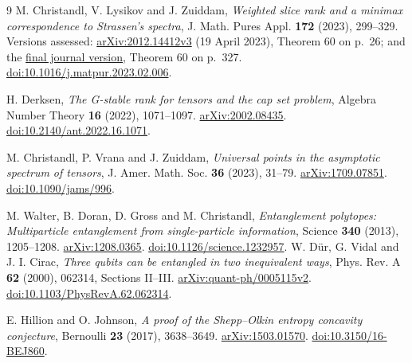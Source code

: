 \documentclass[11pt,a4paper]{article}
\begin{document}
\begin{thebibliography}{9}
M. Christandl, V. Lysikov and J. Zuiddam,
\emph{Weighted slice rank and a minimax correspondence to Strassen's spectra},
J. Math. Pures Appl. \textbf{172} (2023), 299--329.
Versions assessed: \href{https://arxiv.org/abs/2012.14412v3}{arXiv:2012.14412v3}
(19 April 2023), Theorem 60 on p.~26; and the
\href{https://dare.uva.nl/id/5f9e575f-cd5d-4316-8f0c-9320c049778f}{final journal version},
Theorem 60 on p.~327.
\href{https://doi.org/10.1016/j.matpur.2023.02.006}{doi:10.1016/j.matpur.2023.02.006}.

H. Derksen, \emph{The G-stable rank for tensors and the cap set problem},
Algebra Number Theory \textbf{16} (2022), 1071--1097.
\href{https://arxiv.org/abs/2002.08435}{arXiv:2002.08435}.
\href{https://doi.org/10.2140/ant.2022.16.1071}{doi:10.2140/ant.2022.16.1071}.

M. Christandl, P. Vrana and J. Zuiddam,
\emph{Universal points in the asymptotic spectrum of tensors},
J. Amer. Math. Soc. \textbf{36} (2023), 31--79.
\href{https://arxiv.org/abs/1709.07851}{arXiv:1709.07851}.
\href{https://doi.org/10.1090/jams/996}{doi:10.1090/jams/996}.

M. Walter, B. Doran, D. Gross and M. Christandl,
\emph{Entanglement polytopes: Multiparticle entanglement from single-particle information},
Science \textbf{340} (2013), 1205--1208.
\href{https://arxiv.org/abs/1208.0365}{arXiv:1208.0365}.
\href{https://doi.org/10.1126/science.1232957}{doi:10.1126/science.1232957}.
W. D\"ur, G. Vidal and J. I. Cirac,
\emph{Three qubits can be entangled in two inequivalent ways},
Phys. Rev. A \textbf{62} (2000), 062314, Sections II--III.
\href{https://arxiv.org/abs/quant-ph/0005115v2}{arXiv:quant-ph/0005115v2}.
\href{https://doi.org/10.1103/PhysRevA.62.062314}{doi:10.1103/PhysRevA.62.062314}.

E. Hillion and O. Johnson,
\emph{A proof of the Shepp--Olkin entropy concavity conjecture},
Bernoulli \textbf{23} (2017), 3638--3649.
\href{https://arxiv.org/abs/1503.01570}{arXiv:1503.01570}.
\href{https://doi.org/10.3150/16-BEJ860}{doi:10.3150/16-BEJ860}.
\end{thebibliography}
\end{document}
